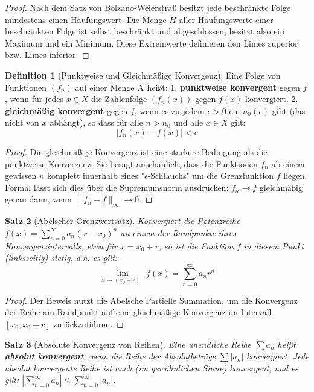 \documentclass{article}
\newtheorem{satz}{Satz}[section]
\theoremstyle{definition}
\newtheorem{definition}[satz]{Definition}
\begin{document}
\begin{proof}
Nach dem Satz von Bolzano-Weierstraß besitzt jede beschränkte Folge mindestens einen Häufungswert. Die Menge $H$ aller Häufungswerte einer beschränkten Folge ist selbst beschränkt und abgeschlossen, besitzt also ein Maximum und ein Minimum. Diese Extremwerte definieren den Limes superior bzw. Limes inferior.
\end{proof}
\begin{definition}[Punktweise und Gleichmäßige Konvergenz]
Eine Folge von Funktionen $(f_n)$ auf einer Menge $X$ heißt:
1. \textbf{punktweise konvergent} gegen $f$, wenn für jedes $x \in X$ die Zahlenfolge $(f_n(x))$ gegen $f(x)$ konvergiert.
2. \textbf{gleichmäßig konvergent} gegen $f$, wenn es zu jedem $\epsilon > 0$ ein $n_0(\epsilon)$ gibt (das nicht von $x$ abhängt), so dass für alle $n > n_0$ und alle $x \in X$ gilt:
$$|f_n(x) - f(x)| < \epsilon$$


\end{definition}
\begin{proof}
Die gleichmäßige Konvergenz ist eine stärkere Bedingung als die punktweise Konvergenz. Sie besagt anschaulich, dass die Funktionen $f_n$ ab einem gewissen $n$ komplett innerhalb eines "$\epsilon$-Schlauchs" um die Grenzfunktion $f$ liegen. Formal lässt sich dies über die Supremumsnorm ausdrücken: $f_n \to f$ gleichmäßig genau dann, wenn $\|f_n - f\|_\infty \to 0$.
\end{proof}
\begin{satz}[Abelscher Grenzwertsatz]
Konvergiert die Potenzreihe $f(x) = \sum_{n=0}^\infty a_n (x-x_0)^n$ an einem der Randpunkte ihres Konvergenzintervalls, etwa für $x = x_0 + r$, so ist die Funktion $f$ in diesem Punkt (linksseitig) stetig, d.h. es gilt:
$$\lim_{x \to (x_0+r)^-} f(x) = \sum_{n=0}^\infty a_n r^n$$


\end{satz}
\begin{proof}
Der Beweis nutzt die Abelsche Partielle Summation, um die Konvergenz der Reihe am Randpunkt auf eine gleichmäßige Konvergenz im Intervall $[x_0, x_0+r]$ zurückzuführen.
\end{proof}
\begin{satz}[Absolute Konvergenz von Reihen]
Eine unendliche Reihe $\sum a_n$ heißt \textbf{absolut konvergent}, wenn die Reihe der Absolutbeträge $\sum |a_n|$ konvergiert.
Jede absolut konvergente Reihe ist auch (im gewöhnlichen Sinne) konvergent, und es gilt:
$|\sum_{n=0}^\infty a_n| \le \sum_{n=0}^\infty |a_n|$.


\end{satz}
\end{document}
